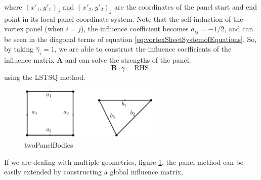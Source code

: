 where $(x'_1,y'_1)_j$ and $(x'_2,y'_2)_j$ are the coordinates of the panel start and end point in its local panel coordinate system. Note that the self-induction of the vortex panel (when $i=j$), the influence coefficient becomes $a_{ij} = -1/2$, and can be seen in the diagonal terms of equation \ref{eq:vortexSheetSystemofEquations}. So, by taking $\hat{\gamma}_i = 1$, we are able to construct the influence coefficients of the influence matrix $\mathbf{A}$ and can solve the strengths of the panel, 
	\begin{equation}
	\mathbf{B}\cdot\gamma = \mathrm{RHS},
	\end{equation}
using the LSTSQ method. 

	\begin{figure}[b]
	\centering
	\includegraphics[width=0.6\textwidth]{figures/lagrangian/twoPanelBodies.pdf}
	\caption{twoPanelBodies}
	\label{fig:twoPanelBodies}
	\end{figure}

If we are dealing with multiple geometries, figure \ref{fig:twoPanelBodies}, the panel method can be easily extended by constructing a global influence matrix, 

